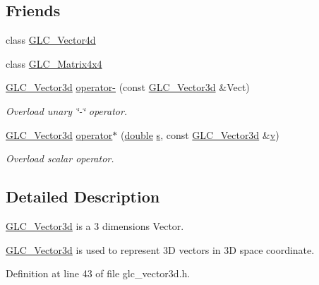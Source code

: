 \subsection*{Friends}
\begin{DoxyCompactItemize}
\item 
class \hyperlink{class_g_l_c___vector3d_a7f0b47b2a85e893a6b383b7242361028}{G\-L\-C\-\_\-\-Vector4d}
\item 
class \hyperlink{class_g_l_c___vector3d_aa0d9f907a2580ab5cf156ead20080059}{G\-L\-C\-\_\-\-Matrix4x4}
\item 
\hyperlink{class_g_l_c___vector3d}{G\-L\-C\-\_\-\-Vector3d} \hyperlink{class_g_l_c___vector3d_a3dcd391ca645621327e9fd273df799cb}{operator-\/} (const \hyperlink{class_g_l_c___vector3d}{G\-L\-C\-\_\-\-Vector3d} \&Vect)
\begin{DoxyCompactList}\small\item\em Overload unary \char`\"{}-\/\char`\"{} operator. \end{DoxyCompactList}\item 
\hyperlink{class_g_l_c___vector3d}{G\-L\-C\-\_\-\-Vector3d} \hyperlink{class_g_l_c___vector3d_a646dbc2354e96f0e6941f4b2776cbea4}{operator$\ast$} (\hyperlink{_super_l_u_support_8h_a8956b2b9f49bf918deed98379d159ca7}{double} \hyperlink{glext_8h_ad585a1393cfa368fa9dc3d8ebff640d5}{s}, const \hyperlink{class_g_l_c___vector3d}{G\-L\-C\-\_\-\-Vector3d} \&\hyperlink{glext_8h_a14cfbe2fc2234f5504618905b69d1e06}{v})
\begin{DoxyCompactList}\small\item\em Overload scalar operator. \end{DoxyCompactList}\end{DoxyCompactItemize}


\subsection{Detailed Description}
\hyperlink{class_g_l_c___vector3d}{G\-L\-C\-\_\-\-Vector3d} is a 3 dimensions Vector. 

\hyperlink{class_g_l_c___vector3d}{G\-L\-C\-\_\-\-Vector3d} is used to represent 3\-D vectors in 3\-D space coordinate. 

Definition at line 43 of file glc\-\_\-vector3d.\-h.



